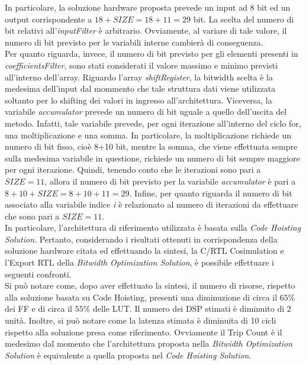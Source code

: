 In particolare, la soluzione hardware proposta prevede un input ad 8 bit ed un output corrispondente a $18+SIZE = 18+11 = 29$ bit. La scelta del numero di bit relativi all'\textit{inputFilter} è arbitrario. Ovviamente, al variare di tale valore, il numero di bit previsto per le variabili interne cambierà di conseguenza. \\
Per quanto riguarda, invece, il numero di bit previsto per gli elementi presenti in \textit{coefficientsFilter}, sono stati considerati il valore massimo e minimo previsti all'interno dell'array. Riguardo l'array \textit{shiftRegister}, la bitwidth scelta è la medesima dell'input dal mommento che tale struttura dati viene utilizzata soltanto per lo shifting dei valori in ingresso all'architettura. Viceversa, la variabile \textit{accumulator} prevede un numero di bit uguale a quello dell'uscita del metodo. Infatti, tale variabile prevede, per ogni iterazione all'interno del ciclo for, una moltiplicazione e una somma. In particolare, la moltiplicazione richiede un numero di bit fisso, cioè 8+10 bit, mentre la somma, che viene effettuata sempre sulla medesima variabile in questione, richiede un numero di bit sempre maggiore per ogni iterazione. Quindi, tenendo conto che le iterazioni sono pari a $SIZE=11$, allora il numero di bit previsto per la variabile \textit{accumulator} è pari a $8+10+SIZE = 8+10+11 = 29$. Infine, per quanto riguarda il numero di bit associato alla variabile indice \textit{i} è relazionato al numero di iterazioni da effettuare che sono pari a $SIZE=11$.
\\
In particolare, l'architettura di riferimento utilizzata è basata sulla \textit{Code Hoisting Solution}. Pertanto, considerando i risultati ottenuti in corrispondenza della soluzione hardware citata ed effettuando la sintesi, la C/RTL Cosimulation e l'Export RTL della \textit{Bitwidth Optimization Solution}, è possibile effettuare i seguenti confronti.
\\
Si può notare come, dopo aver effettuato la sintesi, il numero di risorse, rispetto alla soluzione basata su Code Hoisting, presenti una diminuzione di circa il $65\%$ dei FF e di circa il $55\%$ delle LUT. Il numero dei DSP stimati è diminuito di 2 unità. Inoltre, si può notare come la latenza stimata è diminuita di 10 cicli rispetto alla soluzione presa come riferimento. Ovviamente il Trip Count è il medesimo dal momento che l'architettura proposta nella \textit{Bitwidth Optimization Solution} è equivalente a quella proposta nel \textit{Code Hoisting Solution}.

